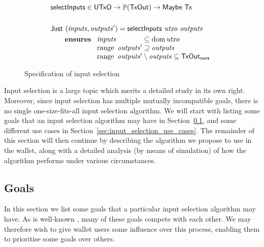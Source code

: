 \documentclass{article}
\DeclareMathOperator{\dom}{dom}
\DeclareMathOperator{\range}{range}
\theoremstyle{definition}{
  \newtheorem{lemma}{Lemma}[section] %
  \newtheorem{definition}[lemma]{Definition}
}
\theoremstyle{theorem}{
  \newtheorem{invariant}[lemma]{Invariant}
  \newtheorem{proofobligation}[lemma]{Proof Obligation}
}
\numberwithin{equation}{lemma}
\begin{document}
\begin{figure}[tb]
\begin{align*}
& \mathsf{selectInputs} \in \mathsf{UTxO} \to \mathbb{P}(\mathsf{TxOut}) \to \mathsf{Maybe} ~ \mathsf{Tx} \\
\\
& \mathsf{Just} ~ (\mathit{inputs}, \mathit{outputs}') = \mathsf{selectInputs} ~ \mathit{utxo} ~ \mathit{outputs} \\
& \qquad \mathbf{ensures~}
\begin{array}[t]{l@{\;}l@{\;}l}
\mathit{inputs}          & \subseteq & \dom \mathit{utxo} \\
\range ~ \mathit{outputs}' & \supseteq & \mathit{outputs}   \\
\multicolumn{3}{l}{\range ~ \mathit{outputs}' \setminus \mathit{outputs} \subseteq \mathsf{TxOut_{ours}}} \\
\end{array}
\end{align*}
\caption{\label{fig:input_selection_sig}Specification of input selection}
\end{figure}

Input selection is a large topic which merits a detailed study in its own right.
Moreover, since input selection has multiple mutually incompatible goals, there
is no single one-size-fits-all input selection algorithm. We will start with
listing some goals that an input selection algorithm may have in
Section~\ref{sec:inputselection_goals}, and some different use cases in
Section~\ref{sec:input_selection_use_cases}. The remainder of this section will
then continue by describing the algorithm we propose to use in the wallet, along
with a detailed analysis (by means of simulation) of how the algorithm performs
under various circumstances.

\subsection{Goals}
\label{sec:inputselection_goals}

In this section we list some goals that a particular input selection algorithm
may have. As is well-known \citep{lopp:challenges}, many of these goals compete
with each other. We may therefore wish to give wallet users some influence over
this process, enabling them to prioritise some goals over others.
\end{document}
